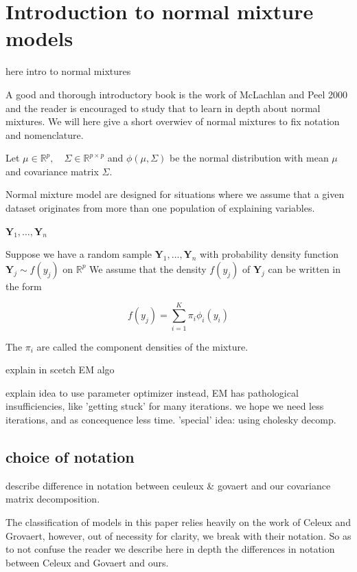 \chapter{Introduction to normal mixture models}%

here intro to normal mixtures

A good and thorough introductory book is the work of McLachlan and Peel 2000 and
the reader is encouraged to study that to learn in depth about normal mixtures. 
We will here give a short overwiev of normal mixtures to fix notation and nomenclature.

Let $ \mu \in \mathbb{R}^p , \quad \Sigma \in \mathbb{R}^{p \times p} $ and 
$ \phi(\mu, \Sigma) $ be the normal distribution with
mean $ \mu $ and covariance matrix $ \Sigma $.

Normal mixture model are designed for situations where we assume that a given 
dataset originates from more than one population of explaining variables.

$ \pmb{Y}_1, \dots , \pmb{Y}_n $

\begin{definition}
	Suppose we have a random sample $ \pmb{Y}_1, \dots , \pmb{Y}_n $ with 
	probability density function $ \pmb{Y}_j \sim f(y_j) $ on $\mathbb{R}^p$
	We assume that the density $ f(y_j) $ of $ \pmb{Y}_j $ can be written in
	the form 

	\[ f(y_j) = \sum_{i=1}^{K} \pi_i \phi_i (y_i) \]

	The $ \pi_i $ are called the component densities of the mixture.
\end{definition}

explain in scetch EM algo

explain idea to use parameter optimizer instead,
EM has pathological insufficiencies, like 'getting stuck' for many iterations.
we hope we need less iterations, and as concequence less time.
'special' idea: using cholesky decomp.


\section{choice of notation}

describe difference in notation between ceuleux \& govaert and our covariance matrix decomposition.

The classification of models in this paper relies heavily on the work of Celeux and Grovaert,
however, out of necessity for clarity, we break with their notation. 
So as to not confuse the reader we describe here in depth the differences in notation
between Celeux and Govaert and ours.

